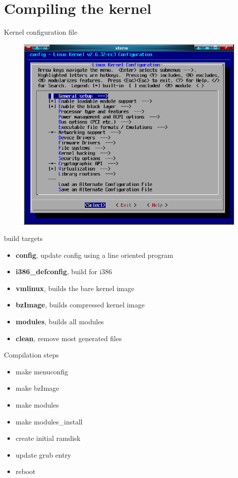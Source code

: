 \documentclass{workshop}
\begin{document}
\section{Compiling the kernel}

\begin{frame}{Kernel configuration file}

\begin{figure}
  \includegraphics[scale=0.4]{img/Linux-kernel-menuconfig.png}
\end{figure}
\end{frame}


\begin{frame}{build targets}
\begin{itemize}
	\item {\bf config}, update config using a line oriented program
	\item {\bf i386_defconfig}, build for i386
	\item {\bf vmlinux}, builds the bare kernel image
	\item {\bf bzImage}, builds compressed kernel image
	\item {\bf modules}, builds all modules
	\item {\bf clean}, remove most generated files
\end{itemize}
\end{frame}

\begin{frame}{Compilation steps}
\begin{itemize}
	\item make menuconfig
	\item make bzImage
	\item make modules
	\item make modules_install
	\item create initial ramdisk
	\item update grub entry
	\item reboot
\end{itemize}
\end{frame}
\end{document}
